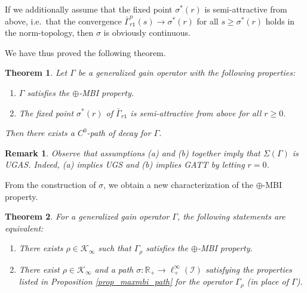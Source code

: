 \documentclass[10pt, oneside, a4paper]{article}
\newcommand{\R}{\mathbb{R}}
\newcommand{\unit}{\mathds{1}}
\newcommand{\IC}{\mathcal{I}}
\newcommand{\KC}{\mathcal{K}}
\newcommand{\bsign}[1]{\bar{#1}}
\newtheorem{theorem}{Theorem}[section]
\newtheorem{remark}{Remark}[section]
\begin{document}
If we additionally assume that the fixed point $\sigma^*(r)$ is semi-attractive from above, i.e.~that the convergence $\bsign{\Gamma}_{r\unit}^n(s) \rightarrow \sigma^*(r)$ for all $s \geq \sigma^*(r)$ holds in the norm-topology, then $\sigma$ is obviously continuous.%

We have thus proved the following theorem.%

\begin{theorem}\label{thm_third_path_construction}
Let $\Gamma$ be a generalized gain operator with the following properties:%
\begin{enumerate}
\item[(i)] $\Gamma$ satisfies the $\oplus$-MBI property.%
\item[(ii)] The fixed point $\sigma^*(r)$ of $\bsign{\Gamma}_{r\unit}$ is semi-attractive from above for all $r \geq 0$.%
\end{enumerate}
Then there exists a $C^0$-path of decay for $\Gamma$.
\end{theorem}

\begin{remark}
Observe that assumptions (a) and (b) together imply that $\Sigma(\Gamma)$ is UGAS. Indeed, (a) implies UGS and (b) implies GATT by letting $r = 0$.
\end{remark}

From the construction of $\sigma$, we obtain a new characterization of the $\oplus$-MBI property.%

\begin{theorem}\label{thm_maxmbi_path_char}
For a generalized gain operator $\Gamma$, the following statements are equivalent:%
\begin{enumerate}
\item[(a)] There exists $\rho \in \KC_{\infty}$ such that $\Gamma_{\rho}$ satisfies the $\oplus$-MBI property.%
\item[(b)] There exist $\rho \in \KC_{\infty}$ and a path $\sigma:\R_+ \rightarrow \ell^{\infty}_+(\IC)$ satisfying the properties listed in Proposition \ref{prop_maxmbi_path} for the operator $\Gamma_{\rho}$ (in place of $\Gamma$).
\end{enumerate}
\end{theorem}
\end{document}
